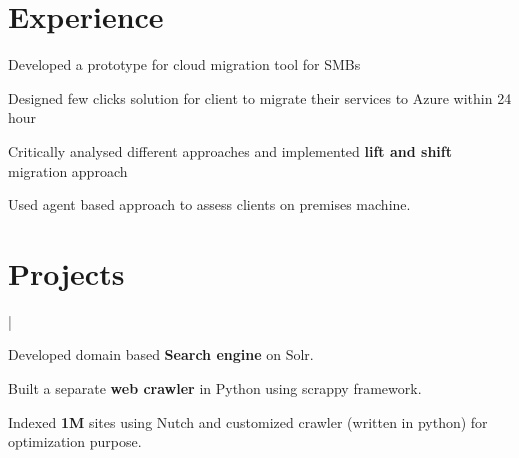 \documentclass[a4paper]{deedy-resume-openfont}
\begin{document}
\hfill
\begin{minipage}[t]{0.63\textwidth} 

\section{Experience}
\vspace{\topsep}
\begin{tightemize}
\item Developed a prototype for cloud migration tool for SMBs
\item Designed few clicks solution for client to migrate their services to Azure within 24 hour
\item Critically analysed different approaches and implemented \textbf{lift and shift} migration approach
\item Used agent based approach to assess clients on premises machine.
\end{tightemize}

\section{Projects}
 | 
\begin{tightemize}
\item Developed domain based \textbf{Search engine} on Solr.
\item Built a separate \textbf{web crawler} in Python using scrappy framework.
\item Indexed \textbf{1M} sites using Nutch and customized crawler (written in python) for optimization purpose.
\end{tightemize}
\sectionsep



\end{minipage}
\end{document}
